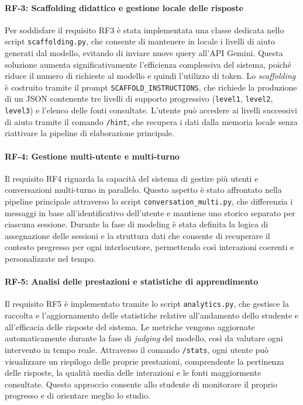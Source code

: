 \documentclass[a4paper,9pt]{article}
\begin{document}
\paragraph{RF-3: Scaffolding didattico e gestione locale delle risposte}

Per soddisfare il requisito RF3 è stata implementata una classe dedicata nello script \texttt{scaffolding.py}, che consente di mantenere in locale i livelli di aiuto generati dal modello, evitando di inviare nuove query all’API Gemini.  
Questa soluzione aumenta significativamente l’efficienza complessiva del sistema, poiché riduce il numero di richieste al modello e quindi l’utilizzo di token.  
Lo \textit{scaffolding} è costruito tramite il prompt \texttt{SCAFFOLD\_INSTRUCTIONS}, che richiede la produzione di un JSON contenente tre livelli di supporto progressivo (\texttt{level1}, \texttt{level2}, \texttt{level3}) e l’elenco delle fonti consultate.  
L’utente può accedere ai livelli successivi di aiuto tramite il comando \texttt{/hint}, che recupera i dati dalla memoria locale senza riattivare la pipeline di elaborazione principale.  

\paragraph{RF-4: Gestione multi-utente e multi-turno}

Il requisito RF4 riguarda la capacità del sistema di gestire più utenti e conversazioni multi-turno in parallelo.  
Questo aspetto è stato affrontato nella pipeline principale attraverso lo script \texttt{conversation\_multi.py}, che differenzia i messaggi in base all’identificativo dell’utente e mantiene uno storico separato per ciascuna sessione.  
Durante la fase di modeling è stata definita la logica di assegnazione delle sessioni e la struttura dati che consente di recuperare il contesto pregresso per ogni interlocutore, permettendo così interazioni coerenti e personalizzate nel tempo.  

\paragraph{RF-5: Analisi delle prestazioni e statistiche di apprendimento}

Il requisito RF5 è implementato tramite lo script \texttt{analytics.py}, che gestisce la raccolta e l’aggiornamento delle statistiche relative all’andamento dello studente e all’efficacia delle risposte del sistema.  
Le metriche vengono aggiornate automaticamente durante la fase di \textit{judging} del modello, così da valutare ogni intervento in tempo reale.  
Attraverso il comando \texttt{/stats}, ogni utente può visualizzare un riepilogo delle proprie prestazioni, comprendente la pertinenza delle risposte, la qualità media delle interazioni e le fonti maggiormente consultate.  
Questo approccio consente allo studente di monitorare il proprio progresso e di orientare meglio lo studio.
\end{document}
